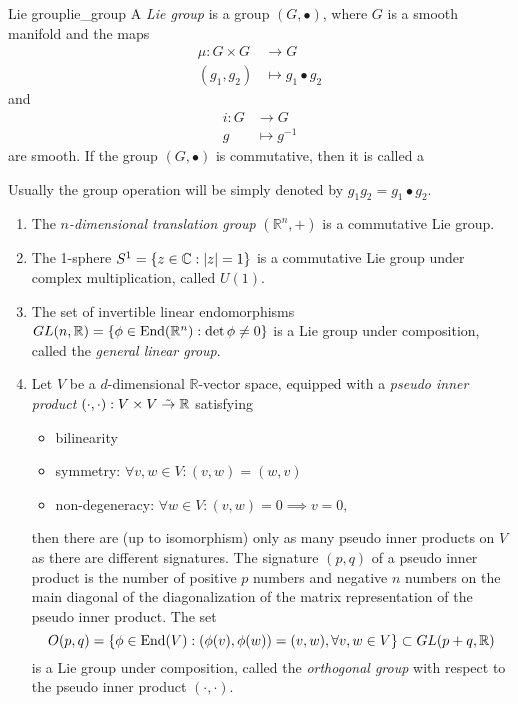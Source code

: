 \begin{definition}{Lie group}{lie_group}
    A \emph{Lie group} is a group \((G, \bullet)\), where \(G\) is a smooth manifold and the maps
    \begin{align*}
        \mu : G \times G &\to G\\
             (g_1, g_2)  &\mapsto g_1 \bullet g_2
    \end{align*}
    and
    \begin{align*}
        i : G &\to G\\
        g &\mapsto g^{-1}
    \end{align*}
    are smooth. If the group \((G, \bullet)\) is commutative, then it is called a
\end{definition}
\begin{remark}
    Usually the group operation will be simply denoted by \(g_1 g_2 = g_1\bullet g_2.\)
\end{remark}
\begin{example}
    \begin{enumerate}[label=(\alph*)]
        \item The \emph{\(n\)-dimensional translation group} \((\mathbb{R}^n, +)\) is a commutative Lie group.
        \item The 1-sphere \(S^1 = \set{z \in \mathbb{C} : |z| = 1}\)  is a commutative Lie group under complex multiplication, called \(U(1).\)
        \item The set of invertible linear endomorphisms \(GL(n, \mathbb{R}) = \set{\phi \in \End(\mathbb{R}^n) : \det \phi \neq 0}\) is a Lie group under composition, called the \emph{general linear group}.
        \item Let \(V\) be a \(d\)-dimensional \(\mathbb{R}\)-vector space, equipped with a \emph{pseudo inner product} \((\cdot, \cdot) : V \times V \linear \mathbb{R}\) satisfying
            \begin{itemize}
                \item bilinearity
                \item symmetry: \(\forall v, w \in V : (v, w) = (w, v)\)
                \item non-degeneracy: \(\forall w \in V : (v, w) = 0 \implies v = 0,\)
            \end{itemize}
            then there are (up to isomorphism) only as many pseudo inner products on \(V\) as there are different signatures. The signature \((p,q)\) of a pseudo inner product is the number of positive \(p\) numbers and negative \(n\) numbers on the main diagonal of the diagonalization of the matrix representation of the pseudo inner product. The set
            \begin{equation*}
                O(p,q) = \set*{ \phi \in \End(V) : (\phi(v), \phi(w)) = (v, w), \forall v,w \in V} \subset GL(p+q, \mathbb{R})
            \end{equation*}
            is a Lie group under composition, called the \emph{orthogonal group} with respect to the pseudo inner product \((\cdot, \cdot)\).
    \end{enumerate}
\end{example}


